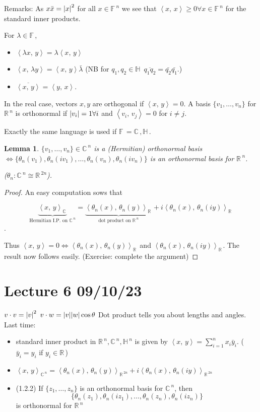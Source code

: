 \documentclass[12pt,a4paper]{article}
\newcommand{\rR}{\ensuremath{\mathbb{R}\,}}
\newcommand{\cC}{\ensuremath{\mathbb{C}\,}}
\newcommand{\hH}{\ensuremath{\mathbb{H}\,}}
\newcommand{\fF}{\ensuremath{\mathbb{F}\,}}
\newcommand{\ol}[1]{\overline{#1}}
\newcommand{\ipm}[2]{\ensuremath{\left\langle #1, \, #2 \right\rangle}}
\newtheorem{lemma}[thm]{Lemma}
\begin{document}
Remarks: As $x\bar{x}=\abs{x}^2$ for all $x\in \fF^n$ we see that $\ipm{x}{x}\geq 0  \forall x \in \fF^n$ for the standard inner products.

For $\lambda \in \fF$,

\begin{itemize}
\item $\ipm{\lambda x}{ y}=\lambda \ipm{x}{y}$
\item $\ipm{ x}{ \lambda y}=\ipm{x}{y}\bar{\lambda}$ (NB for $q_1,q_2\in \hH$ $\ol{q_1q_2}=\bar{q_2}\bar{q_1}$.)
\item $\ol{\ipm{ x}{y}}=\ipm{ y}{x}$.
\end{itemize}

In the real case, vectors $x,y$ are orthogonal if $\ipm{ x}{y}=0$. A basis $\{v_1,\ldots,v_n\}$ for $\rR^n$ is orthonormal if $\abs{v_i}=1 \forall i$ and $\ipm{ v_i}{v_j}=0$ for $i\neq j$.

Exactly the same language is used if $\fF = \cC, \hH$.

\begin{lemma}
$\{v_1,\ldots,v_n\} \in \cC^n$ is a (Hermitian) orthonormal basis $\iff \{\theta_n(v_1), \theta_n(iv_1), \ldots , \theta_n(v_n), \theta_n(iv_n)\}$ is an orthonormal basis for $\rR^n$. 

($\theta_n:\cC^n \cong \rR^{2n}$).
\end{lemma}

\begin{proof}
An easy computation sows that 

\[\underbrace{\ipm{x}{y}_\cC}_{\text{Hermitian I.P. on } \cC^n} = \underbrace{\ipm{\theta_n(x)}{\theta_n(y)}_\rR}_{\text{dot product on } \rR^n}+i\ipm{\theta_n(x)}{\theta_n(iy)}_\rR\].

Thus $\ipm{x}{y}=0 \iff  \ipm{\theta_n(x)}{\theta_n(y)}_\rR $ and $\ipm{\theta_n(x)}{\theta_n(iy)}_\rR $. The result now follows easily. (Exercise: complete the argument)
\end{proof}

\section{Lecture 6 09/10/23}
$v\cdot v =\abs{v}^2$
%
$v\cdot w = \abs{v}\abs{w}\cos\theta$
%
Dot product tells you about lengths and angles.
%
Last time:

\begin{itemize}
\item standard inner product in $\rR^n, \cC^n, \hH^n$ is given by $\ipm{x}{y}=\sum\limits_{i=1}^n x_i\bar{y}_i$.
($\bar{y}_i=y_i$ if $y_i\in \rR$)
\item $\ipm{x}{y}_{\cC^n}= \ipm{\theta_n(x)}{\theta_n(y)}_{\rR^{2n}}+i\ipm{\theta_n(x)}{\theta_n(iy)}_{\rR^{2n}}$
\item (1.2.2) If $\{z_1,\ldots, z_n\}$ is an orthonormal basis for $\cC^n$, then 
\[\{\theta_n(z_1), \theta_n(iz_1), \ldots , \theta_n(z_n), \theta_n(iz_n)\}\]
is orthonormal for $\rR^n$
\end{itemize}
\end{document}
